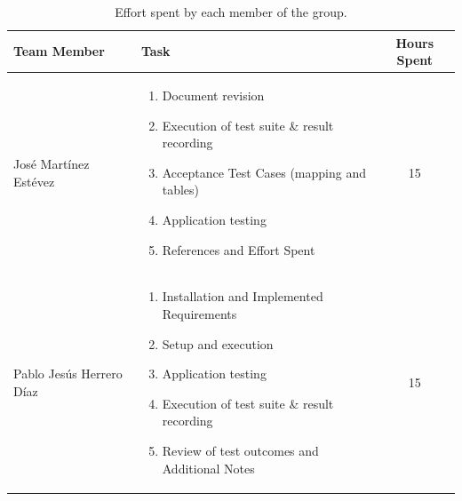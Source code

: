 \begin{table}[H]
    \centering
    \begin{tabular}{|p{}|p{}|c|}
        \hline
        \textbf{Team Member} & \textbf{Task} & \textbf{Hours Spent} \\ 
        \hline
        Jos\'e Mart\'inez Est\'evez & 
        \begin{enumerate}
            \item Document revision
            \item Execution of test suite \& result recording
            \item Acceptance Test Cases (mapping and tables)
            \item Application testing
            \item References and Effort Spent
        \end{enumerate} & 15 \\ 
        \hline
        Pablo Jes\'us Herrero D\'iaz & 
        \begin{enumerate}
            \item Installation and Implemented Requirements
            \item Setup and execution
            \item Application testing
            \item Execution of test suite \& result recording
            \item Review of test outcomes and Additional Notes
        \end{enumerate} & 15 \\ 
        \hline
    \end{tabular}
    \caption{Effort spent by each member of the group.}
    \label{tab:effort_spent}
\end{table}
